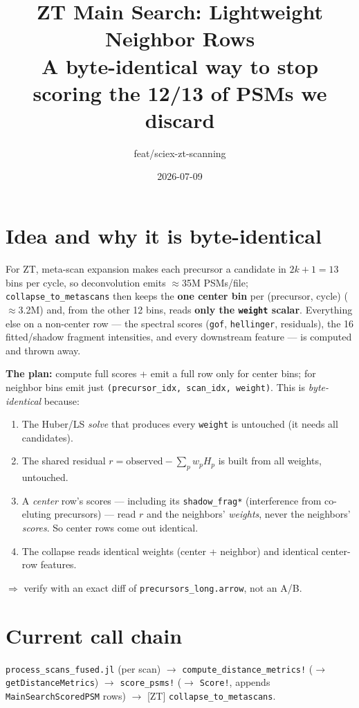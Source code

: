 \documentclass[11pt]{article}
\title{\textbf{ZT Main Search: Lightweight Neighbor Rows}\\[4pt]
\large A byte-identical way to stop scoring the 12/13 of PSMs we discard}
\author{feat/sciex-zt-scanning}
\date{2026-07-09}
\newcommand{\code}[1]{\texttt{\small #1}}
\begin{document}
\maketitle

\section{Idea and why it is byte-identical}

For ZT, meta-scan expansion makes each precursor a candidate in $2k{+}1{=}13$ bins per
cycle, so deconvolution emits $\approx$35M PSMs/file; \code{collapse\_to\_metascans}
then keeps the \textbf{one center bin} per (precursor, cycle) ($\approx$3.2M) and, from
the other 12 bins, reads \textbf{only the \code{weight} scalar}. Everything else on a
non-center row --- the spectral scores (\code{gof}, \code{hellinger}, residuals), the
16 fitted/shadow fragment intensities, and every downstream feature --- is computed and
thrown away.

\textbf{The plan:} compute full scores + emit a full row only for center bins; for
neighbor bins emit just \code{(precursor\_idx, scan\_idx, weight)}. This is
\emph{byte-identical} because:
\begin{enumerate}
\item The Huber/LS \emph{solve} that produces every \code{weight} is untouched (it needs
all candidates).
\item The shared residual $r = \text{observed} - \sum_p w_p H_p$ is built from all
weights, untouched.
\item A \emph{center} row's scores --- including its \code{shadow\_frag*} (interference
from co-eluting precursors) --- read $r$ and the neighbors' \emph{weights}, never the
neighbors' \emph{scores}. So center rows come out identical.
\item The collapse reads identical weights (center + neighbor) and identical center-row
features.
\end{enumerate}
$\Rightarrow$ verify with an exact diff of \code{precursors\_long.arrow}, not an A/B.

\section{Current call chain}

\code{process\_scans\_fused.jl} (per scan) $\to$ \code{compute\_distance\_metrics!}
($\to$ \code{getDistanceMetrics}) $\to$ \code{score\_psms!} ($\to$ \code{Score!},
appends \code{MainSearchScoredPSM} rows) $\to$ [ZT] \code{collapse\_to\_metascans}.
\end{document}
